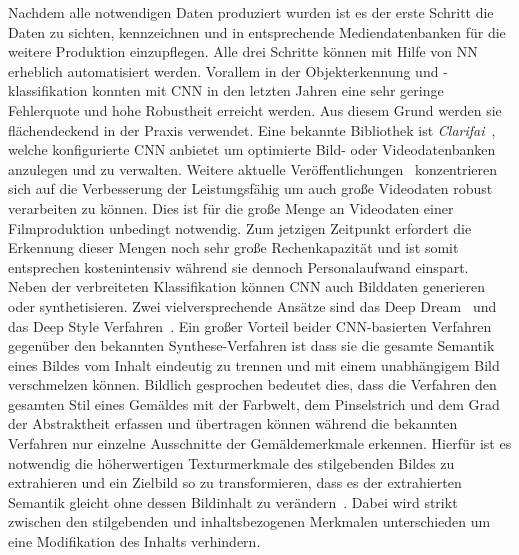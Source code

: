 \documentclass[times, 11pt,twocolumn]{article}
\begin{document}
Nachdem alle notwendigen Daten produziert wurden ist es der erste Schritt die Daten zu sichten, kennzeichnen und in entsprechende Mediendatenbanken für die weitere Produktion einzupflegen. Alle drei Schritte können mit Hilfe von NN erheblich automatisiert werden. Vorallem in der Objekterkennung und -klassifikation konnten mit CNN in den letzten Jahren eine sehr geringe Fehlerquote und hohe Robustheit erreicht werden. Aus diesem Grund werden sie flächendeckend in der Praxis verwendet. Eine bekannte Bibliothek ist \textit{Clarifai}~\cite{MITReview}, welche konfigurierte CNN anbietet um optimierte Bild- oder Videodatenbanken anzulegen und zu verwalten.  Weitere aktuelle Veröffentlichungen~\cite{Ng_VideoLabelling}\cite{Ye:VideoLabelling}\cite{KangEABZ17} konzentrieren sich auf die Verbesserung der Leistungsfähig um auch große Videodaten robust verarbeiten zu können. Dies ist für die große Menge an Videodaten einer Filmproduktion unbedingt notwendig. Zum jetzigen Zeitpunkt erfordert die Erkennung dieser Mengen noch sehr große Rechenkapazität und ist somit entsprechen kostenintensiv während sie dennoch Personalaufwand einspart. \\

Neben der verbreiteten Klassifikation können CNN auch Bilddaten generieren oder synthetisieren. Zwei vielversprechende Ansätze sind das Deep Dream~\cite{DeepDream} und das Deep Style Verfahren~\cite{GatysEB15a}. Ein großer Vorteil beider CNN-basierten Verfahren gegenüber den bekannten Synthese-Verfahren ist dass sie die gesamte Semantik eines Bildes vom Inhalt eindeutig zu trennen und mit einem unabhängigem Bild verschmelzen können. Bildlich gesprochen bedeutet dies, dass die  Verfahren den gesamten Stil eines Gemäldes mit der Farbwelt, dem Pinselstrich und dem Grad der Abstraktheit erfassen und übertragen können während die bekannten Verfahren nur einzelne Ausschnitte der Gemäldemerkmale erkennen. Hierfür ist es notwendig die höherwertigen Texturmerkmale des stilgebenden Bildes zu extrahieren und ein Zielbild so zu transformieren, dass es der extrahierten Semantik gleicht ohne dessen Bildinhalt zu verändern~\cite{McCaigDG16}. Dabei wird strikt zwischen den stilgebenden und inhaltsbezogenen Merkmalen unterschieden um eine Modifikation des Inhalts verhindern.
\end{document}
